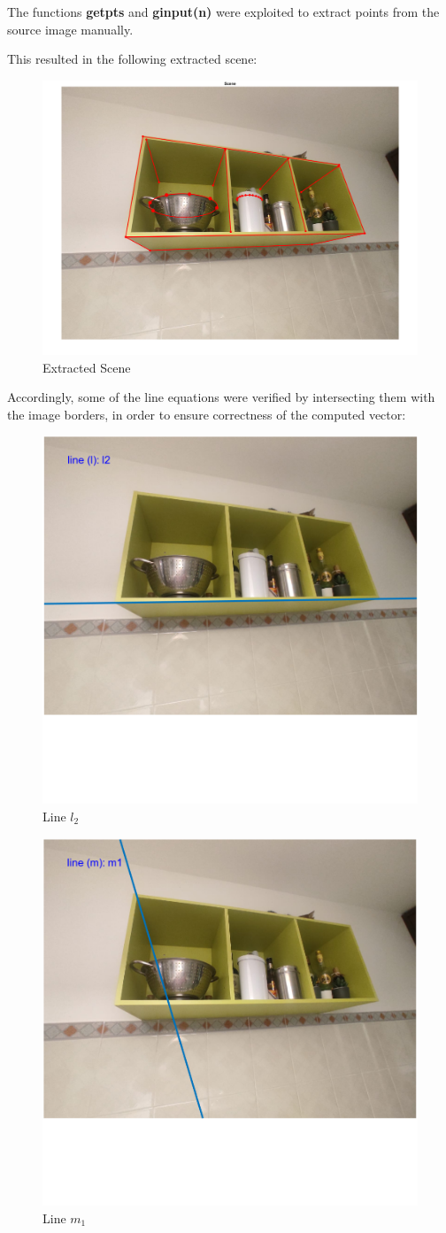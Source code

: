 \documentclass{Configuration_Files/PoliMi3i_thesis}
\begin{document}
The functions \textbf{getpts} and \textbf{ginput(n)} were exploited to extract points from the source image manually.

This resulted in the following extracted scene:
\begin{figure}[H]
    \centering
    \includegraphics[width=0.75\linewidth]{Project Template/Images/extracted_scene.png}
    \caption{Extracted Scene}
    \label{fig:enter-label}
\end{figure}

Accordingly, some of the line equations were verified by intersecting them with the image borders, in order to ensure correctness of the computed vector:
\begin{figure}[H]
    \centering
    \includegraphics[width=0.5\linewidth]{Project Template/Images/l2.png}
    \caption{Line $l_2$}
    \label{fig:enter-label}
\end{figure}

\begin{figure}[H]
    \centering
    \includegraphics[width=0.5\linewidth]{Project Template/Images/m1.png}
    \caption{Line $m_1$}
    \label{fig:enter-label}
\end{figure}
\end{document}
